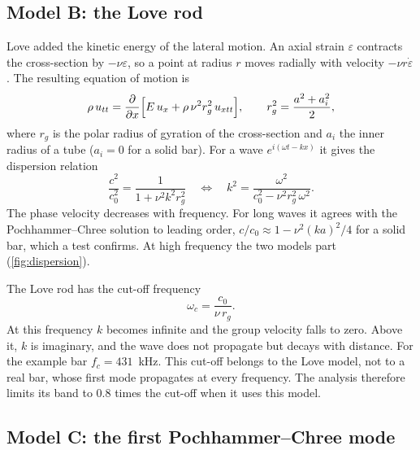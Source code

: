 \documentclass[11pt,a4paper,numbers=noenddot,abstract=true]{scrartcl}
\begin{document}
\subsection{Model B: the Love rod}

Love added the kinetic energy of the lateral motion. An axial strain $\varepsilon$ contracts the cross-section by
$-\nu\varepsilon$, so a point at radius $r$ moves radially with velocity $-\nu r \dot\varepsilon$. The resulting
equation of motion is
\begin{equation}
  \rho\, u_{tt} = \frac{\partial}{\partial x}\Bigl[E\, u_x + \rho\, \nu^2 r_g^2\, u_{xtt}\Bigr], \qquad
  r_g^2 = \frac{a^2 + a_i^2}{2},
\end{equation}
where $r_g$ is the polar radius of gyration of the cross-section and $a_i$ the inner radius of a tube ($a_i = 0$
for a solid bar). For a wave $e^{i(\omega t - kx)}$ it gives the dispersion relation
\begin{equation}
  \frac{c^2}{c_0^2} = \frac{1}{1 + \nu^2 k^2 r_g^2}
  \quad\Longleftrightarrow\quad
  k^2 = \frac{\omega^2}{c_0^2 - \nu^2 r_g^2\, \omega^2}.
\end{equation}
The phase velocity decreases with frequency. For long waves it agrees with the Pochhammer--Chree solution to
leading order, $c / c_0 \approx 1 - \nu^2 (ka)^2 / 4$ for a solid bar, which a test confirms. At high frequency
the two models part (\cref{fig:dispersion}).

The Love rod has the cut-off frequency
\begin{equation}
  \omega_c = \frac{c_0}{\nu\, r_g}.
\end{equation}
At this frequency $k$ becomes infinite and the group velocity falls to zero. Above it, $k$ is imaginary, and the
wave does not propagate but decays with distance. For the example bar $f_c = 431$~kHz. This cut-off belongs to the
Love model, not to a real bar, whose first mode propagates at every frequency. The analysis therefore limits its
band to 0.8 times the cut-off when it uses this model.

\subsection{Model C: the first Pochhammer--Chree mode}
\end{document}
